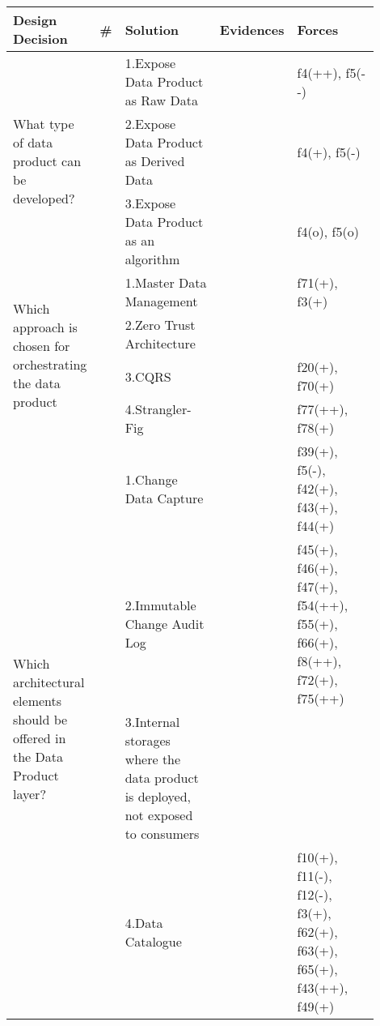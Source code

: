 \begin{tabular}{|p{0.12\linewidth}|p{0.015\linewidth}|p{0.3\linewidth}|p{0.15\linewidth}|p{0.31\linewidth}|}
\hline
{\bf Design Decision} & {\bf \#} & {\bf Solution} & {\bf Evidences} & {\bf Forces}\\
\hline
\multirow{3}{\linewidth}{What type of data product can be developed?} &\cellcolor{emerald_shape_3}{} &1.Expose Data Product as Raw Data&\cellcolor{emerald_shape_7}{s1, s2, s6, s7, s9, s14, s15, s27, s34, s43} & f4(++), f5(-{}-)\\
 & \cellcolor{emerald_shape_3}{} & 2.Expose Data Product as Derived Data&\cellcolor{emerald_shape_7}{s1, s2, s6, s9, s14, s15, s27, s34} & f4(+), f5(-)\\
 & \multirow{-3}{\linewidth}{ \cellcolor{emerald_shape_3}{10}} &3.Expose Data Product as an algorithm&\cellcolor{emerald_shape_4}{s2, s6} & f4(o), f5(o)\\
\multirow{4}{\linewidth}{Which approach is chosen for orchestrating the data product} &\cellcolor{emerald_shape_4}{} &1.Master Data Management&\cellcolor{emerald_shape_5}{s7, s9, s23, s44, s48, s56} & f71(+), f3(+)\\
 & \cellcolor{emerald_shape_4}{} & 2.Zero Trust Architecture&\cellcolor{emerald_shape_3}{s45, s56} & \\
 & \cellcolor{emerald_shape_4}{} & 3.CQRS&\cellcolor{emerald_shape_5}{s8, s38, s39, s41, s43, s56} & f20(+), f70(+)\\
 & \multirow{-4}{\linewidth}{ \cellcolor{emerald_shape_4}{13}} &4.Strangler-Fig&\cellcolor{emerald_shape_3}{s56, s57} & f77(++), f78(+)\\
\multirow{5}{\linewidth}{Which architectural elements should be offered in the Data Product layer?} &\cellcolor{emerald_shape_6}{} &1.Change Data Capture&\cellcolor{emerald_shape_4}{s4, s17, s20, s38, s45, s48, s53, s54, s55, s56} & f39(+), f5(-), f42(+), f43(+), f44(+)\\
 & \cellcolor{emerald_shape_6}{} & 2.Immutable Change Audit Log&\cellcolor{emerald_shape_5}{s4, s8, s12, s31, s32, s35, s36, s45, s47, s48, s53, s54, s55, s56, s57} & f45(+), f46(+), f47(+), f54(++), f55(+), f66(+), f8(++), f72(+), f75(++)\\
 & \cellcolor{emerald_shape_6}{} & 3.Internal storages where the data product is deployed, not exposed to consumers&\cellcolor{emerald_shape_4}{s4, s13, s15, s32, s33, s36, s49} & \\
 & \cellcolor{emerald_shape_6}{} & 4.Data Catalogue&\cellcolor{emerald_shape_6}{s1, s3, s5, s7, s9, s15, s16, s25, s30, s31, s32, s37, s43, s47, s48, s53, s55} & f10(+), f11(-), f12(-), f3(+), f62(+), f63(+), f65(+), f43(++), f49(+)\\

\end{tabular}
